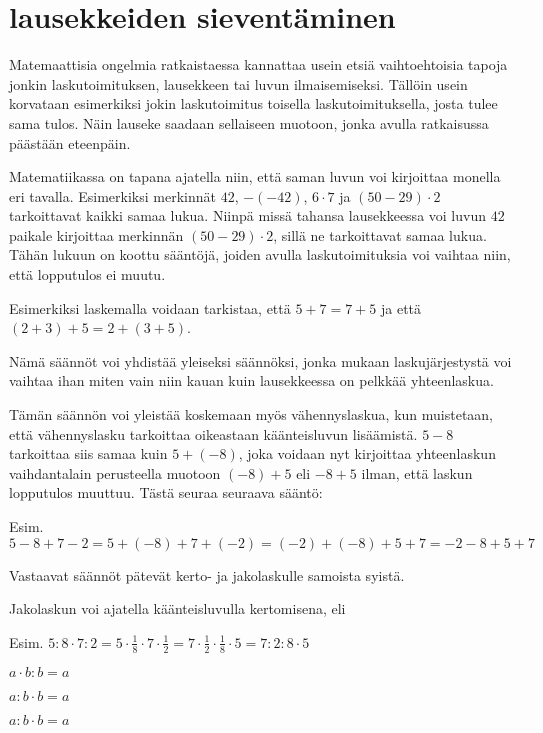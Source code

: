 \section{lausekkeiden sieventäminen}

Matemaattisia ongelmia ratkaistaessa kannattaa usein etsiä vaihtoehtoisia tapoja jonkin laskutoimituksen, lausekkeen tai luvun ilmaisemiseksi. Tällöin usein korvataan esimerkiksi jokin laskutoimitus toisella laskutoimituksella, josta tulee sama tulos. Näin lauseke saadaan sellaiseen muotoon, jonka avulla ratkaisussa päästään eteenpäin.

Matematiikassa on tapana ajatella niin, että saman luvun voi kirjoittaa monella eri tavalla. Esimerkiksi merkinnät $42$, $-(-42)$, $6\cdot 7$ ja $(50-29)\cdot 2$ tarkoittavat kaikki samaa lukua. Niinpä missä tahansa lausekkeessa voi luvun $42$ paikale kirjoittaa merkinnän $(50-29)\cdot 2$, sillä ne tarkoittavat samaa lukua. Tähän lukuun on koottu sääntöjä, joiden avulla laskutoimituksia voi vaihtaa niin, että lopputulos ei muutu.


Esimerkiksi laskemalla voidaan tarkistaa, että $5+7=7+5$ ja että $(2+3)+5=2+(3+5)$.

Nämä säännöt voi yhdistää yleiseksi säännöksi, jonka mukaan laskujärjestystä voi vaihtaa ihan miten vain niin kauan kuin lausekkeessa on pelkkää yhteenlaskua.

Tämän säännön voi yleistää koskemaan myös vähennyslaskua, kun muistetaan, että vähennyslasku tarkoittaa oikeastaan käänteisluvun lisäämistä. $5-8$ tarkoittaa siis samaa kuin $5+(-8)$, joka voidaan nyt kirjoittaa yhteenlaskun vaihdantalain perusteella muotoon $(-8)+5$ eli $-8+5$ ilman, että laskun lopputulos muuttuu. Tästä seuraa seuraava sääntö:


Esim. $5-8+7-2=5+(-8)+7+(-2)=(-2)+(-8)+5+7=-2-8+5+7$

Vastaavat säännöt pätevät kerto- ja jakolaskulle samoista syistä.


Jakolaskun voi ajatella käänteisluvulla kertomisena, eli


Esim. $5:8\cdot 7:2=5\cdot\frac18\cdot 7\cdot\frac12=7\cdot \frac12\cdot\frac18\cdot 5=7:2:8\cdot 5$

$a\cdot b:b=a$

$a:b\cdot b=a$

$a:b\cdot b=a$
